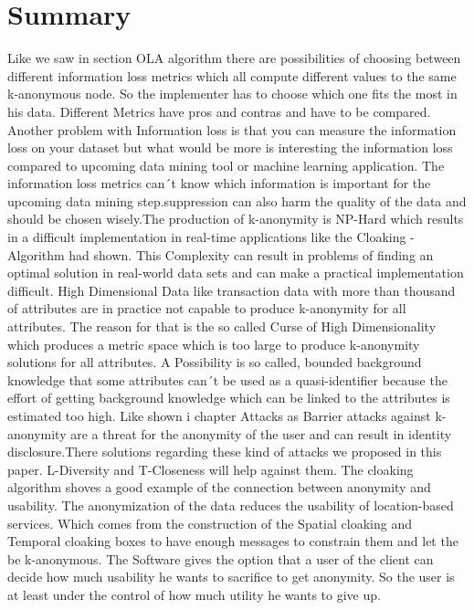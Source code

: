 \documentclass{llncs}
\begin{document}
\section{Summary}
Like we saw in section OLA algorithm there are possibilities of choosing between different information loss metrics which all compute different values to the same k-anonymous node. So the implementer has to choose which one fits the most in his data. Different Metrics have pros and contras and have to be compared. Another problem with Information loss is that you can measure the information loss on your dataset but what would be more is interesting the information loss compared to upcoming data mining tool or machine learning application. The information loss metrics can´t know which information is important for the upcoming data mining step.suppression can also harm the quality of the data and should be chosen wisely.The production of k-anonymity is NP-Hard which results in a difficult implementation in real-time applications like the Cloaking - Algorithm had shown. This Complexity can result in problems of finding an optimal solution in real-world data sets and can make a practical implementation difficult. High Dimensional Data like transaction data with more than thousand of attributes are in practice not capable to produce k-anonymity for all attributes. The reason for that is the so called Curse of High Dimensionality which produces a metric space which is too large to produce k-anonymity solutions for all attributes. A  Possibility is so called, bounded background knowledge that some attributes can´t be used as a quasi-identifier because the effort of getting background knowledge which can be linked to the attributes is estimated too high. Like shown i chapter {Attacks as Barrier} attacks against k-anonymity are a threat for the anonymity of the user and can result in identity disclosure.There solutions regarding these kind of attacks we proposed in this paper. L-Diversity and T-Closeness will help against them. The cloaking algorithm shoves a good example of the connection between anonymity and usability. The anonymization of the data reduces the usability of location-based services. Which comes from the construction of the Spatial cloaking and Temporal cloaking boxes to have enough messages to constrain them and let the be k-anonymous. The Software gives the option that a user of the client can decide how much usability he wants to sacrifice to get anonymity. So the user is at least under the control of how much utility he wants to give up. 

\newpage


\end{document}
